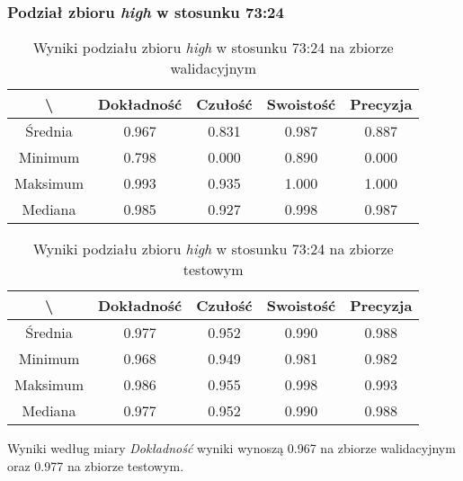 \subsubsection{Podział zbioru \textit{high} w stosunku 73:24}


\begin{table}[H]
	\centering
	\caption{Wyniki podziału zbioru \textit{high} w stosunku 73:24 na zbiorze walidacyjnym}
	\vspace{6pt}
	{\footnotesize
		\begin{tabular}{|c|c|c|c|c|}
      \hline \textbackslash & Dokładność & Czułość & Swoistość & Precyzja \\
      \hline Średnia & 0.967 & 0.831 & 0.987 & 0.887 \\
      \hline Minimum & 0.798 & 0.000 & 0.890 & 0.000 \\
      \hline Maksimum & 0.993 & 0.935 & 1.000 & 1.000 \\
      \hline Mediana & 0.985 & 0.927 & 0.998 & 0.987 \\
      \hline
    \end{tabular}
    \label{Tab:highsplitc_val}
	}
	\vspace{0pt}
\end{table}

\begin{table}[H]
	\centering
	\caption{Wyniki podziału zbioru \textit{high} w stosunku 73:24 na zbiorze testowym}
	\vspace{6pt}
	{\footnotesize
		\begin{tabular}{|c|c|c|c|c|}
      \hline \textbackslash & Dokładność & Czułość & Swoistość & Precyzja \\
      \hline Średnia & 0.977 & 0.952 & 0.990 & 0.988 \\
      \hline Minimum & 0.968 & 0.949 & 0.981 & 0.982 \\
      \hline Maksimum & 0.986 & 0.955 & 0.998 & 0.993 \\
      \hline Mediana & 0.977 & 0.952 & 0.990 & 0.988 \\
      \hline
    \end{tabular}
    \label{Tab:highsplitc_test}
	}
	\vspace{0pt}
\end{table}

Wyniki według miary \textit{Dokładność} wyniki wynoszą 0.967 na zbiorze walidacyjnym oraz 0.977 na zbiorze testowym.
